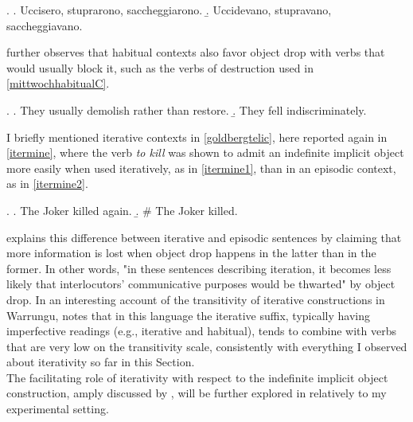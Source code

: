 \ex. \label{mittwoch4ita} \a. \label{mittwoch4ita1} Uccisero, stuprarono, saccheggiarono.
\b. \label{mittwoch4ita2} Uccidevano, stupravano, saccheggiavano.


\textcite[250]{Mittwoch2005} further observes that habitual contexts also favor object drop with verbs that would usually block it, such as the verbs of destruction used in \ref{mittwochhabitualC}.

\ex. \label{mittwochhabitualC} \a. \label{mittwochhabitual6} They usually demolish rather than restore.
\b. \label{mittwochhabitual7} They fell indiscriminately.

I briefly mentioned iterative contexts in \ref{goldbergtelic}, here reported again in \ref{itermine}, where the verb \textit{to kill} was shown to admit an indefinite implicit object more easily when used iteratively, as in \ref{itermine1}, than in an episodic context, as in \ref{itermine2}.

\ex. \label{itermine} \a. \label{itermine1} The Joker killed again.
\b. \label{itermine2} \# The Joker killed.

\textcite[5]{Glass2013} explains this difference between iterative and episodic sentences by claiming that more information is lost when object drop happens in the latter than in the former. In other words, "in these sentences describing iteration, it becomes less likely that interlocutors' communicative purposes would be thwarted" by object drop. In an interesting account of the transitivity of iterative constructions in Warrungu, \textcite[4-5]{Tsunoda1999} notes that in this language the iterative suffix, typically having imperfective readings (e.g., iterative and habitual), tends to combine with verbs that are very low on the transitivity scale, consistently with everything I observed about iterativity so far in this Section.\\
The facilitating role of iterativity with respect to the indefinite implicit object construction, amply discussed by \textcite{Goldberg2001}, will be further explored in  relatively to my experimental setting.



